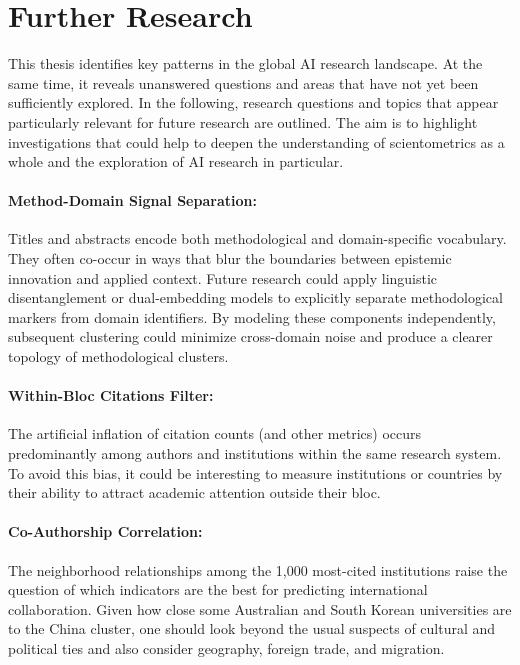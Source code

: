 \documentclass{article}
\begin{document}
	\section{Further Research}
	
	This thesis identifies key patterns in the global AI research landscape. At the same time, it reveals unanswered questions and areas that have not yet been sufficiently explored. In the following, research questions and topics that appear particularly relevant for future research are outlined. The aim is to highlight investigations that could help to deepen the understanding of scientometrics as a whole and the exploration of AI research in particular.
	
	
	\paragraph{Method-Domain Signal Separation:} Titles and abstracts encode both methodological and domain-specific vocabulary. They often co-occur in ways that blur the boundaries between epistemic innovation and applied context. Future research could apply linguistic disentanglement or dual-embedding models to explicitly separate methodological markers from domain identifiers. By modeling these components independently, subsequent clustering could minimize cross-domain noise and produce a clearer topology of methodological clusters.
	
	\paragraph{Within-Bloc Citations Filter:} The artificial inflation of citation counts (and other metrics) occurs predominantly among authors and institutions within the same research system. To avoid this bias, it could be interesting to measure institutions or countries by their ability to attract academic attention outside their bloc.
	
	\paragraph{Co-Authorship Correlation:} The neighborhood relationships among the 1,000 most-cited institutions raise the question of which indicators are the best for predicting international collaboration. Given how close some Australian and South Korean universities are to the China cluster, one should look beyond the usual suspects of cultural and political ties and also consider geography, foreign trade, and migration.
	
\end{document}
